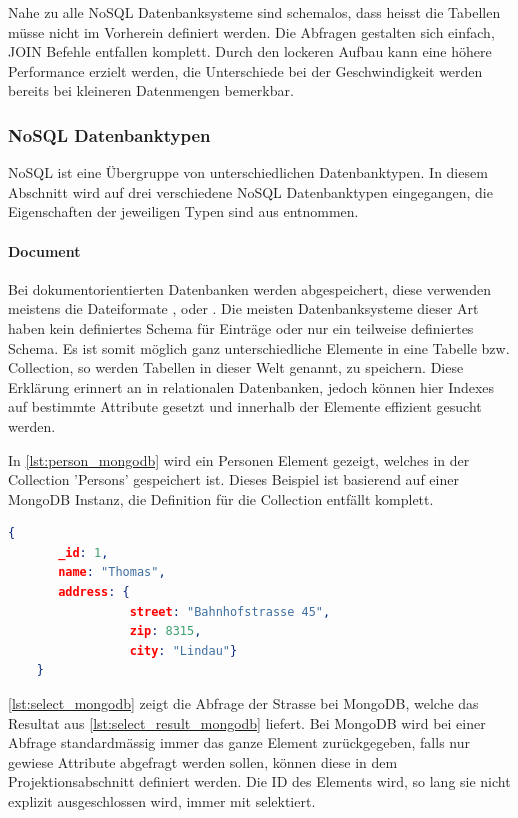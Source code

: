Nahe zu alle NoSQL Datenbanksysteme sind schemalos, dass heisst die Tabellen müsse nicht im Vorherein definiert werden. Die Abfragen gestalten sich einfach, JOIN Befehle entfallen 
komplett. Durch den lockeren Aufbau kann eine höhere Performance erzielt werden, die Unterschiede bei der Geschwindigkeit werden bereits bei kleineren Datenmengen bemerkbar.

\subsubsection{NoSQL Datenbanktypen}\label{no_sql_db_subgroups}
NoSQL ist eine Übergruppe von unterschiedlichen Datenbanktypen. In diesem Abschnitt wird auf drei verschiedene NoSQL Datenbanktypen eingegangen, die Eigenschaften der jeweiligen
 Typen sind aus \cite{vaish2013getting} entnommen.

\paragraph{Document}
Bei dokumentorientierten Datenbanken werden  abgespeichert, diese verwenden meistens die Dateiformate , 
 oder . Die meisten Datenbanksysteme dieser Art haben kein definiertes Schema für Einträge oder 
nur ein teilweise definiertes Schema. Es ist somit möglich ganz unterschiedliche Elemente in eine Tabelle bzw. Collection, so werden Tabellen in dieser Welt genannt, zu speichern. Diese Erklärung 
erinnert an  in relationalen Datenbanken, jedoch können hier Indexes auf bestimmte Attribute gesetzt und innerhalb der Elemente effizient gesucht 
werden.

In \autoref{lst:person_mongodb} wird ein Personen Element gezeigt, welches in der Collection 'Persons' gespeichert ist. Dieses Beispiel ist basierend auf einer MongoDB Instanz, die Definition 
für die Collection entfällt komplett.

\begin{lstlisting}[language=JSON, caption=Personen Element in JSON Format, label=lst:person_mongodb]  
    {
       _id: 1,
       name: "Thomas",
       address: {
                 street: "Bahnhofstrasse 45",
                 zip: 8315,
                 city: "Lindau"}
    }
\end{lstlisting}

\autoref{lst:select_mongodb} zeigt die Abfrage der Strasse bei MongoDB, welche das Resultat aus \autoref{lst:select_result_mongodb} liefert. Bei MongoDB wird bei einer Abfrage standardmässig 
immer das ganze Element zurückgegeben, falls nur gewiese Attribute abgefragt werden sollen, können diese in dem Projektionsabschnitt definiert werden. Die ID des Elements wird, so lang 
sie nicht explizit ausgeschlossen wird, immer mit selektiert.

